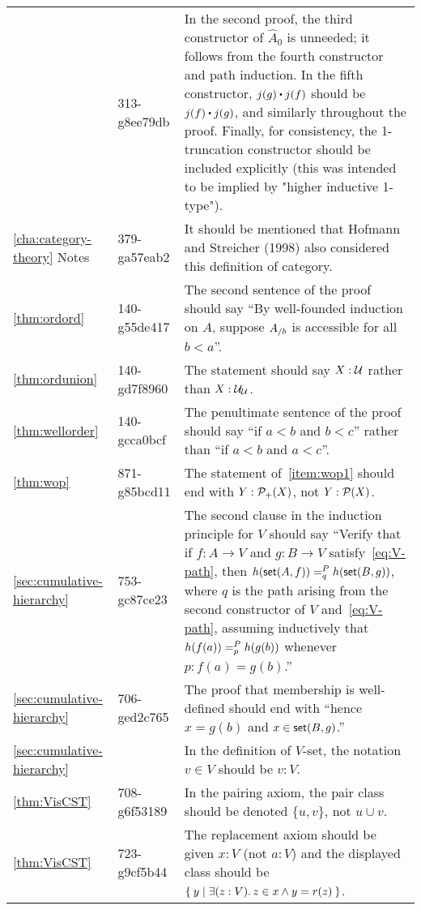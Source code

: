 \documentclass[
%
%
11pt %
]{article}
\begin{document}
\begin{longtable}{llp{10.5cm}}
  & 313-g8ee79db
  & In the second proof, the third constructor of $\widehat A_0$ is unneeded; it follows from the fourth constructor and path induction.
  In the fifth constructor, $j(g)\ct j(f)$ should be $j(f)\ct j(g)$, and similarly throughout the proof.
  Finally, for consistency, the 1-truncation constructor should be included explicitly (this was intended to be implied by "higher inductive 1-type").\\
  \cref{cha:category-theory} Notes
  & 379-ga57eab2
  & It should be mentioned that Hofmann and Streicher (1998) also considered this definition of category.\\
  \cref{thm:ordord}
  & 140-g55de417
  & The second sentence of the proof should say ``By well-founded induction on $A$, suppose $\ordsl A b$ is accessible for all $b<a$''.\\
  \cref{thm:ordunion}
  & 140-gd7f8960
  & The statement should say $X:\UU$ rather than $X:\UU_\UU$.\\
  \cref{thm:wellorder}
  & 140-gcca0bcf
  & The penultimate sentence of the proof should say ``if $a<b$ and $b<c$'' rather than ``if $a<b$ and $a<c$''.\\
  \cref{thm:wop}
  & 871-g85bcd11
  & The statement of~\ref{item:wop1} should end with $Y:\powerp X$, not $Y:\power X$.\\
  \cref{sec:cumulative-hierarchy}
  & 753-gc87ce23
  & The second clause in the induction principle for $V$ should say ``Verify that if $f : A \to V$ and $g : B \to V$ satisfy~\eqref{eq:V-path}, then $\dpath{P}{q}{h(\vset(A,f))}{h(\vset(B,g))}$, where $q$ is the path arising from the second constructor of $V$ and~\eqref{eq:V-path}, assuming inductively that $\dpath{P}{p}{h(f(a))}{h(g(b))}$ whenever $p:f(a)=g(b)$.''\\
  \cref{sec:cumulative-hierarchy}
  & 706-ged2c765
  & The proof that membership is well-defined should end with ``hence $x = g(b)$ and $x \in \vset(B,g)$.''\\
  \cref{sec:cumulative-hierarchy}
  & %
  & In the definition of $V$-set, the notation $v \in V$ should be $v:V$.\\
  \cref{thm:VisCST}
  & 708-g6f53189
  & In the pairing axiom, the pair class should be denoted $\{u, v\}$, not $u\cup v$.\\
  \cref{thm:VisCST}
  & 723-g9cf5b44
  & The replacement axiom should be given $x : V$ (not $a : V$) and the displayed class should be $\setof{ y | \exis{z : V} z \in x \land y = r(z)}$.

\end{longtable}
\end{document}
